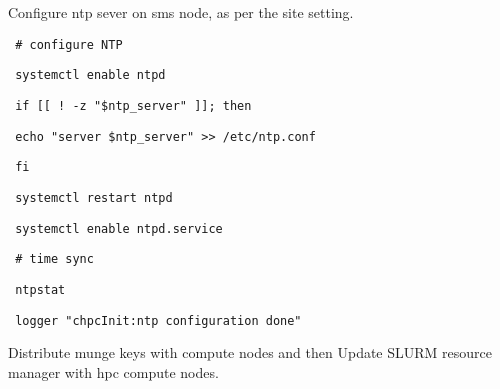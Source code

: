 \begin{section}
Configure ntp sever on sms node, as per the site setting.

\begin{bash}\texttt{\small{ \# configure NTP}}\end{bash}
\begin{bash}\texttt{\small{ systemctl enable ntpd}}\end{bash}
\begin{bash}\texttt{\small{ if [[ ! -z "\$ntp\_server" ]]; then}}\end{bash}
\begin{bash}\texttt{\small{    echo "server \${ntp\_server}" >> /etc/ntp.conf}}\end{bash}
\begin{bash}\texttt{\small{ fi}}\end{bash}
\begin{bash}\texttt{\small{ systemctl restart ntpd}}\end{bash}
\begin{bash}\texttt{\small{ systemctl enable ntpd.service}}\end{bash}
\begin{bash}\texttt{\small{ \# time sync}}\end{bash}
\begin{bash}\texttt{\small{ ntpstat}}\end{bash}
\begin{bash}\texttt{\small{ logger "chpcInit:ntp configuration done"}}\end{bash}

Distribute munge keys with compute nodes and then Update SLURM resource manager with hpc compute nodes.


\end{section}
